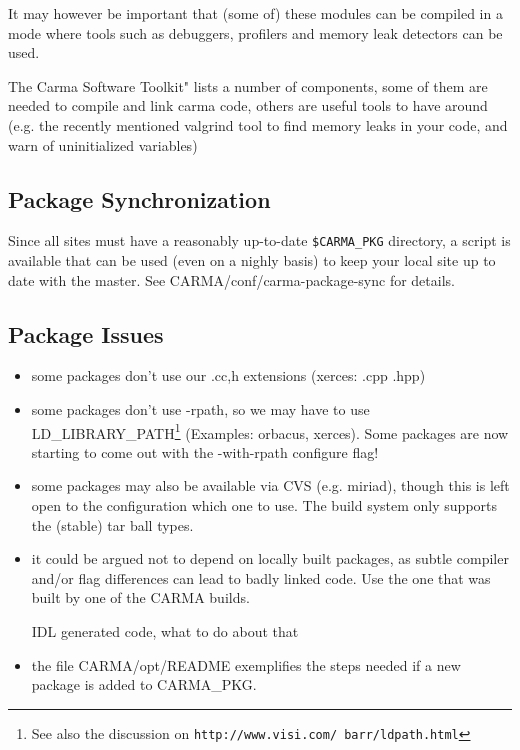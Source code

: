 \documentclass{article}
\begin{document}
It may however be important that (some of) these modules can be compiled
in a mode where tools such as debuggers, profilers and memory leak
detectors can be used.

The Carma Software Toolkit" lists a number of components, some of them
are needed to compile and link carma code, others are useful tools to
have around (e.g. the recently mentioned valgrind tool to find memory
leaks in your code, and warn of uninitialized variables)

\subsection{Package Synchronization}

Since all sites must have a reasonably up-to-date {\tt \$CARMA\_PKG} directory,
a script is available that can be used (even on a nighly basis) to keep
your local site up to date with the master. See CARMA/conf/carma-package-sync
for details.

\subsection{Package Issues}


\begin{itemize}

\item some packages don't use our {.cc,h} extensions (xerces: .cpp   .hpp)

\item some packages don't use -rpath, so we may have to use 
LD\_LIBRARY\_PATH\footnote{See also the discussion on {\tt http://www.visi.com/~barr/ldpath.html}}
(Examples:     orbacus, xerces). Some packages are now starting to come 
out with the -with-rpath configure flag!

\item some packages may also be available via CVS (e.g. miriad), though this
is left open to the configuration which one to use. The build system only
supports the (stable) tar ball types.

\item it could be  argued not to depend on locally built packages, as subtle
compiler and/or flag differences can lead to badly linked code. Use the one
that was built by one of the CARMA builds.

IDL generated code, what to do about that

\item the file CARMA/opt/README exemplifies the steps needed if a new package
is added to CARMA\_PKG.

\end{itemize}
\end{document}
